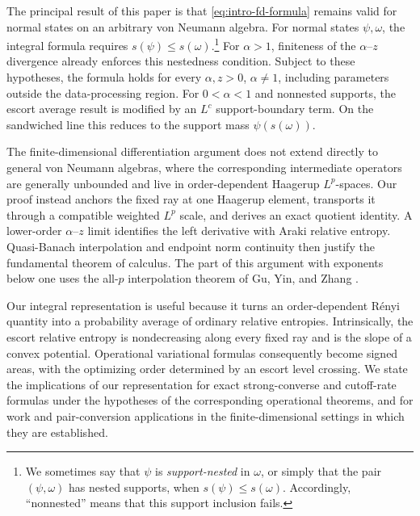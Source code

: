 \documentclass[12pt]{article}
\numberwithin{equation}{section}
\theoremstyle{definition}
\theoremstyle{remark}
\newcommand{\?}{\overset{?}{=}}
\begin{document}
The principal result of this paper is that
\eqref{eq:intro-fd-formula} remains valid for normal states on an
arbitrary von Neumann algebra.  For normal states $\psi,\omega$, the integral formula requires
$s(\psi)\leq s(\omega)$.\footnote{We sometimes say that \(\psi\) is \emph{support-nested} in
\(\omega\), or simply that the pair \((\psi,\omega)\) has nested
supports, when
\(s(\psi)\leq s(\omega) \). 
Accordingly, ``nonnested'' means that this support
inclusion fails.} 
For $\alpha>1$, finiteness of the
$\alpha$--$z$ divergence already enforces this nestedness condition.  
Subject to these hypotheses, the
formula holds for every $\alpha,z>0$, $\alpha\ne1$, including parameters
outside the data-processing region.  For $0<\alpha<1$ and nonnested
supports, the escort average result is modified by an
$L^c$ support-boundary term. On the sandwiched line this reduces to the
support mass $\psi(s(\omega))$. 

The finite-dimensional differentiation argument does not extend
directly to general von Neumann algebras, where the corresponding
intermediate operators
are generally unbounded and live in order-dependent Haagerup
\(L^p\)-spaces. Our proof instead anchors the fixed ray
at one Haagerup element, transports it through a compatible weighted
$L^p$ scale, and derives an exact quotient identity.  A lower-order
$\alpha$--$z$ limit identifies the left derivative with Araki relative
entropy.  Quasi-Banach interpolation and endpoint norm continuity then
justify the fundamental theorem of calculus.  The part of this argument
with exponents below one uses the all-$p$ interpolation theorem of
Gu, Yin, and Zhang \cite{Gu:2019jfc}.

Our integral representation is useful because it turns an order-dependent
R\'enyi quantity into a probability average of ordinary relative
entropies.  Intrinsically, the escort relative entropy is nondecreasing
along every fixed ray and is the slope of a convex potential.  Operational
variational formulas consequently become signed areas, with the optimizing
order determined by an escort level crossing.  We state the implications of our representation for exact strong-converse and
cutoff-rate formulas under the hypotheses of the corresponding operational
theorems, and for work and pair-conversion applications
in the finite-dimensional settings in which they are established.
\end{document}
